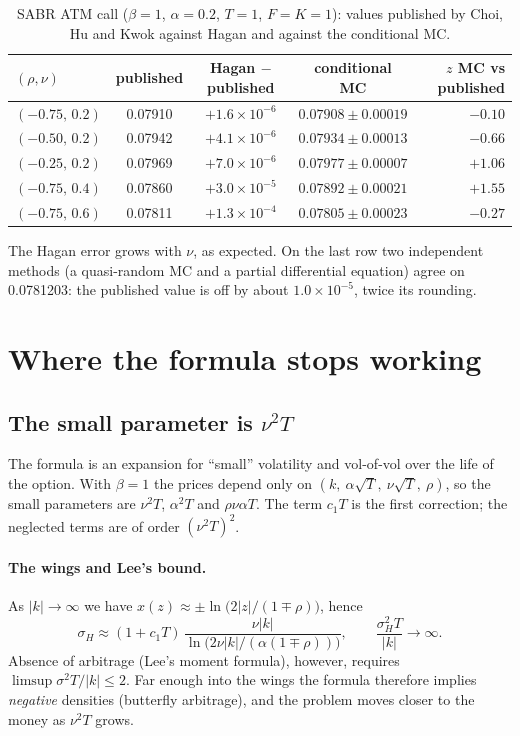 \begin{table}[htbp]
\centering
\small
\caption{SABR ATM call ($\beta=1$, $\alpha=0.2$, $T=1$, $F=K=1$): values published by Choi, Hu and Kwok against
Hagan and against the conditional MC.}
\label{tab:sabr-chk}
\begin{tabular*}{\textwidth}{@{\extracolsep{\fill}}lcccr@{}}
\toprule
$(\rho,\nu)$ & published & Hagan $-$ published & conditional MC & $z$ MC vs published\\
\midrule
$(-0.75,\,0.2)$ & 0.07910 & $+1.6\times10^{-6}$ & $0.07908\pm0.00019$ & $-0.10$\\
$(-0.50,\,0.2)$ & 0.07942 & $+4.1\times10^{-6}$ & $0.07934\pm0.00013$ & $-0.66$\\
$(-0.25,\,0.2)$ & 0.07969 & $+7.0\times10^{-6}$ & $0.07977\pm0.00007$ & $+1.06$\\
$(-0.75,\,0.4)$ & 0.07860 & $+3.0\times10^{-5}$ & $0.07892\pm0.00021$ & $+1.55$\\
$(-0.75,\,0.6)$ & 0.07811 & $+1.3\times10^{-4}$ & $0.07805\pm0.00023$ & $-0.27$\\
\bottomrule
\end{tabular*}
\end{table}

The Hagan error grows with $\nu$, as expected. On the last row two independent methods (a quasi-random MC and a
partial differential equation) agree on 0.0781203: the published value is off by about $1.0\times10^{-5}$, twice its
rounding.

\section{Where the formula stops working}
\subsection{\texorpdfstring{The small parameter is $\nu^2T$}{The small parameter is ν²T}}
The formula is an expansion for ``small'' volatility and vol-of-vol over the life of the option. With $\beta=1$ the
prices depend only on $(k,\ \alpha\sqrt T,\ \nu\sqrt T,\ \rho)$, so the small parameters are $\nu^2T$, $\alpha^2T$
and $\rho\nu\alpha T$. The term $c_1T$ is the first correction; the neglected terms are of order $(\nu^2T)^2$.

\paragraph{The wings and Lee's bound.} As $|k|\to\infty$ we have $x(z)\approx\pm\ln\big(2|z|/(1\mp\rho)\big)$, hence
\[
\sigma_H\approx(1+c_1T)\,\frac{\nu|k|}{\ln\big(2\nu|k|/(\alpha(1\mp\rho))\big)},\qquad
\frac{\sigma_H^2T}{|k|}\to\infty .
\]
Absence of arbitrage (Lee's moment formula), however, requires $\limsup\sigma^2T/|k|\le2$. Far enough into the wings
the formula therefore implies \emph{negative} densities (butterfly arbitrage), and the problem moves closer to the
money as $\nu^2T$ grows.

